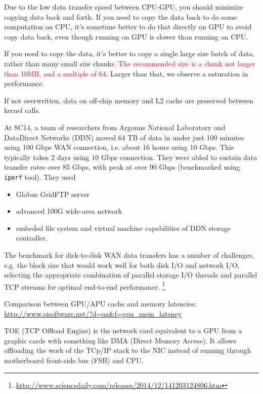   \begin{framed}
    Due to the low data transfer speed between CPU-GPU, you should
    minimize copying data back and forth. If you need to copy the
    data back to do some computation on CPU, it's sometime better to
    do that directly on GPU to avoid copy data back, even though
    running on GPU is slower than running on CPU.

    If you need to copy the data, it's better to copy a single large
    size batch of data, rather than many small size chunks.
    \textcolor{red}{The recommended size is a chunk not larger than 10MB, and a
    multiple of 64}. Larger than that, we observe a saturation in performance.

    If not overwritten, data on off-chip memory and L2 cache are preserved
    between kernel calls.
  \end{framed}

At SC14, a team of researchers from Argonne National Laboratory and DataDirect
Networks (DDN) moved 64 TB of data in under just 100 minutes using 100 Gbps WAN
connection, i.e. about 16 hours using 10 Gbps. This typically takes 2 days using
10 Gbps connection. They were abled to sustain data transfer rates over 85 Gbps,
with peak at over 90 Gbps (benchmarked using \verb!iperf! tool). They used
\begin{itemize}
  \item Globus GridFTP server
  \item advanced 100G wide-area network
  \item embeded file system and virtual machine capabilities of DDN storage
  controller.
\end{itemize}

The benchmark for disk-to-disk WAN data transfers has a number of challenges,
e.g. the block size that would work well for both disk I/O and network I/O,
selecting the appropriate combination of parallel storage I/O threads and parallel TCP streams
for optimal end-to-end performance.
\footnote{\url{http://www.sciencedaily.com/releases/2014/12/141203124806.htm}}


Comparison between GPU/APU cache and memory latencies:
\url{http://www.sisoftware.net/?d=qa&f=gpu_mem_latency}
 
TOE (TCP Offload Engine) is the network card equivalent to a GPU from a graphic
cards with something like DMA (Direct Memory Access). It allows offloading the
work of the TCp/IP stack to the NIC instead of running through motherboard
front-side bus (FSB) and CPU. 


